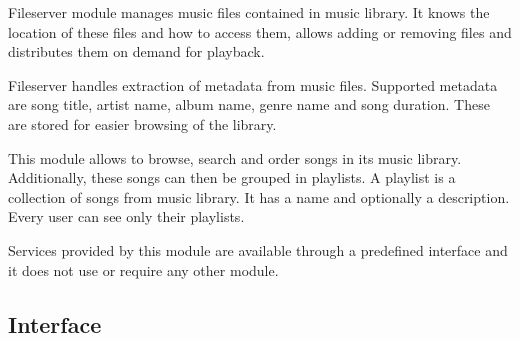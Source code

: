 Fileserver module manages music files contained in music library. It knows the location of these files and how to access them, allows adding or removing files and distributes them on demand for playback.
\par
Fileserver handles extraction of metadata from music files. Supported metadata are song title, artist name, album name, genre name and song duration. These are stored for easier browsing of the library.
\par
This module allows to browse, search and order songs in its music library. Additionally, these songs can then be grouped in playlists. A playlist is a collection of songs from music library. It has a name and optionally a description. Every user can see only their playlists.
\par
Services provided by this module are available through a predefined interface and it does not use or require any other module.

\subsection{Interface}

